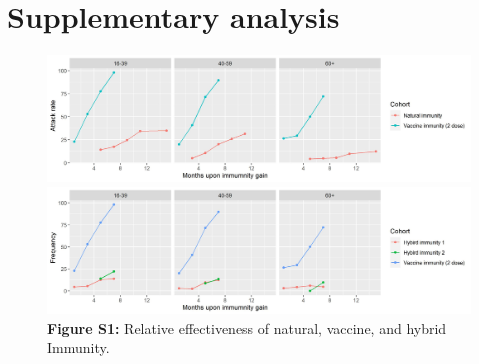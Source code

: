 \documentclass[12pt]{article}
\begin{document}
\section{Supplementary analysis}

\begin{figure}[h]
    \includegraphics*[width=\textwidth]{vaccine_unvaccinated.jpg}
    \includegraphics*[width=\textwidth]{vaccine_vaccined.jpg}
    \textbf{Figure S1:} Relative effectiveness of natural, vaccine, and hybrid Immunity.
\end{figure}

\newpage
    
\end{document}

